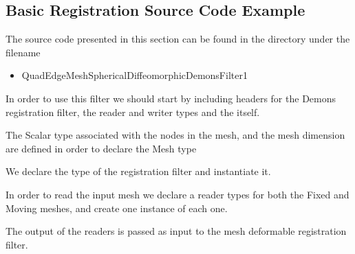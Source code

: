 \documentclass{InsightArticle}
\begin{document}
\subsection{Basic Registration Source Code Example}

The source code presented in this section can be found in the 
directory under the filename

\begin{itemize}
\item QuadEdgeMeshSphericalDiffeomorphicDemonsFilter1
\end{itemize}


In order to use this filter we should start by including headers for the Demons
registration filter, the reader and writer types and the 
itself.

\begin{center}

\end{center}

The Scalar type associated with the nodes in the mesh, and the mesh dimension
are defined in order to declare the Mesh type

\begin{center}

\end{center}

We declare the type of the registration filter and instantiate it.


\begin{center}

\end{center}

In order to read the input mesh we declare a reader types for both the Fixed
and Moving meshes, and create one instance of each one.

\begin{center}

\end{center}

The output of the readers is passed as input to the mesh deformable
registration filter.

\begin{center}

\end{center}
\end{document}
